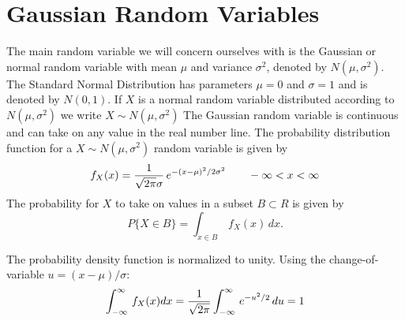\section{Gaussian Random Variables}

 

The main random variable we will concern ourselves with is the Gaussian or normal random variable with mean $\mu$ and variance $\sigma^2$, denoted by $N(\mu, \sigma^2)$. 
The Standard Normal Distribution has parameters $\mu =0$ and $\sigma = 1$ and is denoted by $N(0,1)$. If $X$ is a normal random variable distributed according to $N(\mu,\sigma^2)$ we write 
$X \sim N(\mu, \sigma^2)$
The Gaussian random variable is continuous and can take on any value in the real number line. The probability distribution function for a $X \sim N(\mu,\sigma^2)$ random variable is given by 
$$f_X(x) = {1\over \sqrt{2\pi}\sigma}\, e^{-(x-\mu)^2/2\sigma^2} \quad\quad -\infty < x < \infty$$
The probability for $X$ to take on values in a subset $B \subset R$ is given by $$P\{X \in B\} = \int_{x \in B}\, f_X(x)\, dx.$$

The probability density function is normalized to unity. Using the change-of-variable $u = (x-\mu)/\sigma$: 
\begin{equation}
\int_{-\infty}^{\infty} \, f_X(x) dx = {1\over \sqrt{2\pi}} \int_{-\infty}^{\infty}\, e^{-u^2/2}\, du = 1
\label{eqn:gaussnormalization} \end{equation}\\

